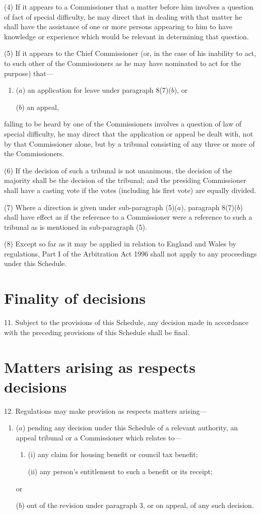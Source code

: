 \documentclass[12pt,a4paper]{article}
\begin{document}
(4) If it appears to a Commissioner that a matter before him involves a question of fact of special difficulty, he may direct that in dealing with that matter he shall have the assistance of one or more persons appearing to him to have knowledge or experience which would be relevant in determining that question.

(5) If it appears to the Chief Commissioner (or, in the case of his inability to act, to such other of the Commissioners as he may have nominated to act for the purpose) that—
\begin{enumerate}\item[]
($a$) an application for leave under paragraph 8(7)($b$), or

($b$) an appeal,
\end{enumerate}
falling to be heard by one of the Commissioners involves a question of law of special difficulty, he may direct that the application or appeal be dealt with, not by that Commissioner alone, but by a tribunal consisting of any three or more of the Commissioners.

(6) If the decision of such a tribunal is not unanimous, the decision of the majority shall be the decision of the tribunal; and the presiding Commissioner shall have a casting vote if the votes (including his first vote) are equally divided.

(7) Where a direction is given under sub-paragraph (5)($a$), paragraph 8(7)($b$)  shall have effect as if the reference to a Commissioner were a reference to such a tribunal as is mentioned in sub-paragraph (5).

(8) Except so far as it may be applied in relation to England and Wales by regulations, Part I of the Arbitration Act 1996 shall not apply to any proceedings under this Schedule.

\section*{Finality of decisions}

11. Subject to the provisions of this Schedule, any decision made in accordance with the preceding provisions of this Schedule shall be final.

\section*{Matters arising as respects decisions}

12. Regulations may make provision as respects matters arising—
\begin{enumerate}\item[]
($a$) pending any decision under this Schedule of a relevant authority, an appeal tribunal or a Commissioner which relates to—
\begin{enumerate}\item[]
(i) any claim for housing benefit or council tax benefit;

(ii) any person’s entitlement to such a benefit or its receipt;
\end{enumerate}
or

($b$) out of the revision under paragraph 3, or on appeal, of any such decision.
\end{enumerate}
\end{document}
